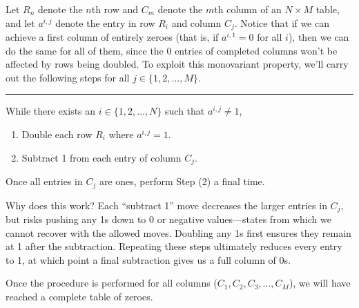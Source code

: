 \begin{solution}
    Let $R_n$ denote the $n$th row and $C_m$ denote the $m$th column of an $N \times M$ table, and let $a^{i,j}$ denote the entry in row $R_i$ and column $C_j$. Notice that if we can achieve a first column of entirely zeroes (that is, if $a^{i,1}=0$ for all $i$), then we can do the same for all of them, since the 0 entries of completed columns won't be affected by rows being doubled. To exploit this monovariant property, we'll carry out the following steps for all $j\in\{1, 2,\ldots,M\}$.

    \noindent
    \hspace{10pt}\begin{minipage}{0.02\linewidth} %
        \rule{1pt}{0.95in} %
    \end{minipage}%
    \begin{minipage}{0.95\linewidth}
        While there exists an $i\in\{1, 2,\ldots,N\}$ such that $a^{i,j} \neq 1$,
        \begin{enumerate}[label=(\arabic*), topsep=1.5mm, itemsep=1mm]
            \item Double each row $R_i$ where $a^{i,j} = 1$.
            \item Subtract 1 from each entry of column $C_j$.
        \end{enumerate}
        Once all entries in $C_j$ are ones, perform Step (2) a final time.
    \end{minipage}
    
    Why does this work? Each “subtract 1” move decreases the larger entries in $C_j$, but risks pushing any 1s down to 0 or negative values---states from which we cannot recover with the allowed moves. Doubling any 1s first ensures they remain at 1 after the subtraction. Repeating these steps ultimately reduces every entry to 1, at which point a final subtraction gives us a full column of 0s.

    Once the procedure is performed for all columns ($C_1,C_2, C_3, \ldots,C_M$), we will have reached a complete table of zeroes.
    
\end{solution}

